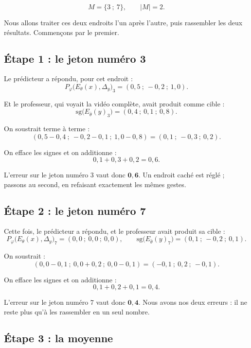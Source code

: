 \[
  M = \{3 \ ; \ 7\} , \qquad |M| = 2 .
\]

Nous allons traiter ces deux endroits l'un après l'autre, puis rassembler
les deux résultats. Commençons par le premier.

\subsection*{Étape 1 : le jeton numéro 3}

Le prédicteur a répondu, pour cet endroit :
\[
  P_{\varphi}\bigl(E_{\theta}(x), \Delta_y\bigr)_3
  = (0{,}5 \ ; \ -0{,}2 \ ; \ 1{,}0) .
\]

Et le professeur, qui voyait la vidéo complète, avait produit comme cible :
\[
  \mathrm{sg}\bigl(E_{\bar{\theta}}(y)_3\bigr)
  = (0{,}4 \ ; \ 0{,}1 \ ; \ 0{,}8) .
\]

On soustrait terme à terme :
\[
  (0{,}5 - 0{,}4 \ ; \ -0{,}2 - 0{,}1 \ ; \ 1{,}0 - 0{,}8)
  = (0{,}1 \ ; \ -0{,}3 \ ; \ 0{,}2) .
\]

On efface les signes et on additionne :
\[
  0{,}1 + 0{,}3 + 0{,}2 = 0{,}6 .
\]

L'erreur sur le jeton numéro $3$ vaut donc $\bm{0{,}6}$. Un endroit caché
est réglé ; passons au second, en refaisant exactement les mêmes gestes.

\subsection*{Étape 2 : le jeton numéro 7}

Cette fois, le prédicteur a répondu, et le professeur avait produit sa
cible :
\[
  P_{\varphi}\bigl(E_{\theta}(x), \Delta_y\bigr)_7 = (0{,}0 \ ; \ 0{,}0 \ ; \ 0{,}0) ,
  \qquad
  \mathrm{sg}\bigl(E_{\bar{\theta}}(y)_7\bigr) = (0{,}1 \ ; \ -0{,}2 \ ; \ 0{,}1) .
\]

On soustrait :
\[
  (0{,}0 - 0{,}1 \ ; \ 0{,}0 + 0{,}2 \ ; \ 0{,}0 - 0{,}1)
  = (-0{,}1 \ ; \ 0{,}2 \ ; \ -0{,}1) .
\]

On efface les signes et on additionne :
\[
  0{,}1 + 0{,}2 + 0{,}1 = 0{,}4 .
\]

L'erreur sur le jeton numéro $7$ vaut donc $\bm{0{,}4}$. Nous avons nos deux
erreurs : il ne reste plus qu'à les rassembler en un seul nombre.

\subsection*{Étape 3 : la moyenne}

